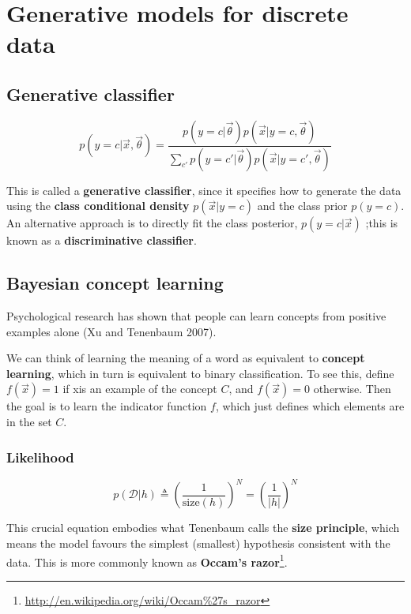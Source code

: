 \chapter{Generative models for discrete data}

\section{Generative classifier}
\begin{equation}\label{eqn:Generative-classifier}
p(y=c|\vec{x},\vec{\theta})=\dfrac{p(y=c|\vec{\theta})p(\vec{x}|y=c,\vec{\theta})}{\sum_{c'}{p(y=c'|\vec{\theta})p(\vec{x}|y=c',\vec{\theta})}}
\end{equation}

This is called a \textbf{generative classifier}, since it specifies how to generate the data using the \textbf{class conditional density} $p(\vec{x}|y=c)$ and the class prior $p(y=c)$. An alternative approach is to directly fit the class posterior, $p(y=c|\vec{x})$ ;this is known as a \textbf{discriminative classifier}. 


\section{Bayesian concept learning}
Psychological research has shown that people can learn concepts from positive examples alone (Xu and Tenenbaum 2007).

We can think of learning the meaning of a word as equivalent to \textbf{concept learning}, which in turn is equivalent to binary classification. To see this, define $f(\vec{x})=1$ if xis an example of the concept $C$, and $f(\vec{x})=0$ otherwise. Then the goal is to learn the indicator function $f$, which just defines which elements are in the set $C$.


\subsection{Likelihood}
\begin{equation}
p(\mathcal{D}|h) \triangleq \left(\dfrac{1}{\text{size}(h)}\right)^N=\left(\dfrac{1}{|h|}\right)^N
\end{equation}

This crucial equation embodies what Tenenbaum calls the \textbf{size principle}, which means the model favours the simplest (smallest) hypothesis consistent with the data. This is more commonly known as \textbf{Occam’s razor}\footnote{\url{http://en.wikipedia.org/wiki/Occam\%27s_razor}}.


